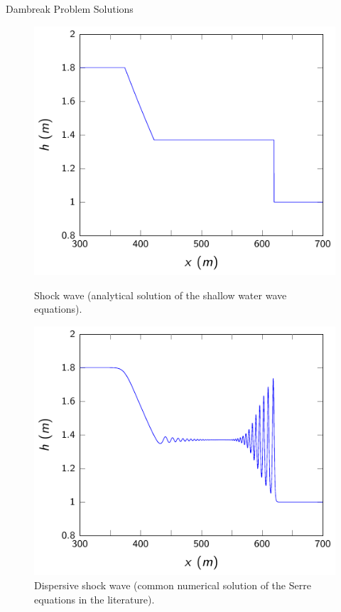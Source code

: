 \documentclass[pdf]{beamer}
\begin{document}
\begin{frame}{Dambreak Problem Solutions}
		
   \begin{figure}
    	\centering
    	\begin{minipage}{.5\textwidth}
    		\centering
    		\includegraphics[width=0.95\linewidth]{./Pictures/DSW/SW.pdf}
    		\caption{Shock wave (analytical solution of the shallow water wave equations).}
    	\end{minipage}%
    	\pause
    	\begin{minipage}{.5\textwidth}
    		\centering
    		\includegraphics[width=0.95\linewidth]{./Pictures/DSW/DSW.pdf}
    		\caption{Dispersive shock wave (common numerical solution of the Serre equations in the literature).}
    	\end{minipage}
   \end{figure}
\end{frame}
\end{document}
